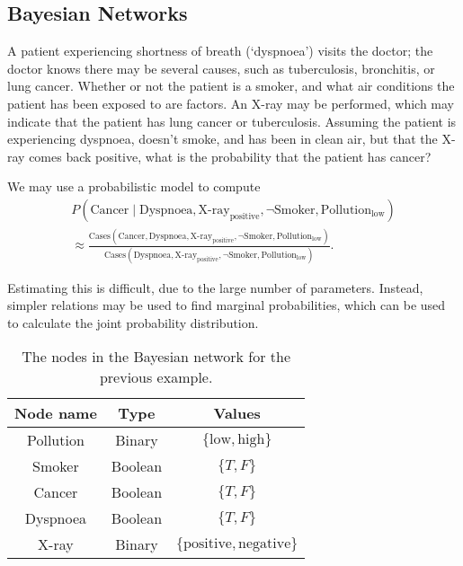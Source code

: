
\subsection{Bayesian Networks}\label{sub:bayesian_networks}

\begin{example}
    A patient experiencing shortness of breath (`dyspnoea') visits the doctor; the doctor knows there may be several causes, such as tuberculosis, bronchitis, or lung cancer. Whether or not the patient is a smoker, and what air conditions the patient has been exposed to are factors. An X-ray may be performed, which may indicate that the patient has lung cancer or tuberculosis. Assuming the patient is experiencing dyspnoea, doesn't smoke, and has been in clean air, but that the X-ray comes back positive, what is the probability that the patient has cancer?

    We may use a probabilistic model to compute
    \begin{gather*}
        P(\text{Cancer} \mid \text{Dyspnoea}, \text{X-ray}_{\text{positive}}, \lnot \text{Smoker}, \text{Pollution}_{\text{low}})\\
        \approx \frac{\text{Cases}(\text{Cancer}, \text{Dyspnoea}, \text{X-ray}_{\text{positive}}, \lnot \text{Smoker}, \text{Pollution}_{\text{low}})}{\text{Cases}(\text{Dyspnoea}, \text{X-ray}_{\text{positive}}, \lnot \text{Smoker}, \text{Pollution}_{\text{low}})}.
    \end{gather*}
    
    Estimating this is difficult, due to the large number of parameters. Instead, simpler relations may be used to find marginal probabilities, which can be used to calculate the joint probability distribution.
\end{example}

\begin{table}[ht]
    \begin{tabular}{|c|c|c|}
        \hline
        Node name & Type & Values\\
        \hline
        Pollution & Binary & $\{ \text{low}, \text{high} \}$\\
        \hline
        Smoker & Boolean & $\{ T, F \}$\\
        \hline
        Cancer & Boolean & $\{ T, F \}$\\
        \hline
        Dyspnoea & Boolean & $\{ T, F \}$\\
        \hline
        X-ray & Binary & $\{ \text{positive}, \text{negative} \}$\\
        \hline
    \end{tabular}
    \caption{The nodes in the Bayesian network for the previous example.}
\end{table}

